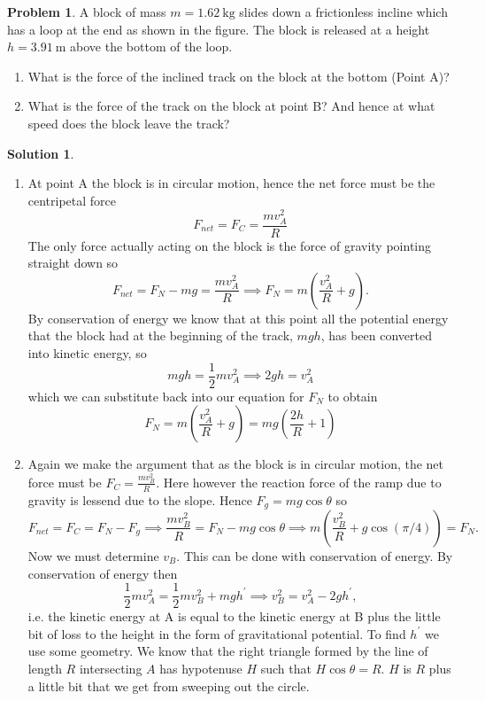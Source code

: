 \documentclass[10pt]{article}
\theoremstyle{definition}
\newtheorem{problem}{Problem}
\newtheorem{soln}{Solution}
\newcommand{\pr}[1]{{#1}^\prime}
\begin{document}
\begin{problem}
A block of mass $m=\qty{1.62}{\kilo\gram}$ slides down a frictionless incline
which has a loop at the end as shown in the figure. The block is
released at a height $h=\qty{3.91}{\meter}$ above the bottom of the loop.
\begin{enumerate}[label=(\alph*)]
  \item What is the force of the inclined track on the block at the
        bottom (Point A)?
  \item What is the force of the track on the block at point B?
        And hence at what speed does the block leave the track?
\end{enumerate}
\end{problem}
\begin{soln}~
  \begin{enumerate}[label=(\alph*)]
    \item At point A the block is in circular motion, hence the net force must be the centripetal force
          $$F_{net}=F_{C}=\frac{mv_A^2}{R}$$
          The only force actually acting on the block is the force of gravity pointing straight down so
          $$F_{net}=F_{N}-mg=\frac{mv_A^2}{R}\implies F_{N}=m\left(\frac{v_A^2}{R}+g\right).$$
          By conservation of energy we know that at this point all the potential energy that the block had at the beginning of the track,
          $mgh$, has been converted into kinetic energy, so
          $$mgh=\frac{1}{2}mv_A^2\implies 2gh=v_A^2$$
          which we can substitute back into our equation for $F_N$ to obtain
          $$F_{N}=m\left(\frac{v_A^2}{R}+g\right)=mg\left(\frac{2h}{R}+1\right)$$
    \item Again we make the argument that as the block is in circular motion, the net force must be $F_C=\frac{mv_B^2}{R}$. Here however the
          reaction force of the ramp due to gravity is lessend due to the slope. Hence $F_g=mg\cos\theta$ so
          $$F_{net}=F_C=F_N-F_g\implies \frac{mv_B^2}{R}=F_N-mg\cos\theta\implies m\left(\frac{v_B^2}{R}+g\cos(\pi/4)\right)=F_N.$$
          Now we must determine $v_B$. This can be done with conservation of energy. By conservation of energy then
          $$\frac{1}{2}mv_A^2=\frac{1}{2}mv_B^2+mg\pr{h}\implies v_B^2=v_A^2-2g\pr{h},$$
          i.e. the kinetic energy at A is equal to the kinetic energy at B plus the little bit of loss to the height in the form of gravitational potential.
          To find $\pr{h}$ we use some geometry. We know that the right triangle formed by
          the line of length $R$ intersecting $A$ has hypotenuse $H$ such that $H\cos\theta=R$. $H$ is $R$ plus a little bit that we get from sweeping out the circle.

\end{enumerate}
\end{soln}
\end{document}
